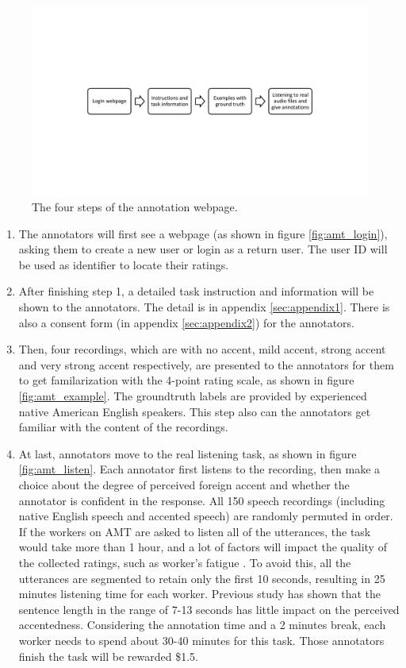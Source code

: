 \begin{figure}[t]
\centering
\captionsetup{justification=centering}
\includegraphics[width = 1.0\linewidth]{figures/amt_procedure.pdf}
\caption{The four steps of the annotation webpage.}
\label{fig:amt_procedure}
\end{figure}

\begin{enumerate}
\item The annotators will first see a webpage (as shown in figure \ref{fig:amt_login}), asking them to create a new user or login as a return user. The user ID will be used as identifier to locate their ratings.
\item After finishing step 1, a detailed task instruction and information will be shown to the annotators. The detail is in appendix \ref{sec:appendix1}. There is also a consent form (in appendix \ref{sec:appendix2}) for the annotators.
\item Then, four recordings, which are with no accent, mild accent, strong accent and very strong accent respectively, are presented to the annotators for them to get familarization with the 4-point rating scale, as shown in figure \ref{fig:amt_example}. The groundtruth labels are provided by experienced native American English speakers. This step also can the annotators get familiar with the content of the recordings.
\item At last, annotators move to the real listening task, as shown in figure \ref{fig:amt_listen}. Each annotator first listens to the recording, then make a choice about the degree of perceived foreign accent and whether the annotator is confident in the response. All 150 speech recordings (including native English speech and accented speech) are randomly permuted in order. If the workers on AMT are asked to listen all of the utterances, the task would take more than 1 hour, and a lot of factors will impact the quality of the collected ratings, such as worker's fatigue \citep{rzeszotarski2013inserting}. To avoid this, all the utterances are segmented to retain only the first 10 seconds, resulting in 25 minutes listening time for each worker. Previous study \citep{munro1995foreign} has shown that the sentence length in the range of 7-13 seconds has little impact on the perceived accentedness. Considering the annotation time and a 2 minutes break, each worker needs to spend about 30-40 minutes for this task. Those annotators finish the task will be rewarded \$1.5.
\end{enumerate}


